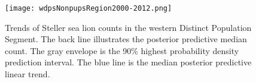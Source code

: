 \documentclass[12pt,letter]{article}
\begin{document}
\nocite{*}


\clearpage

\begin{figure}[htbp] %
   \centering
   \texttt{[image: wdpsNonpupsRegion2000-2012.png]} 
   \caption{Trends of Steller sea lion counts in the western Distinct Population Segment. The back line illustrates the posterior predictive median count. The gray envelope is the 90\% highest probability density prediction interval. The blue line is the median posterior predictive linear trend.}
   \label{fig:example}
\end{figure}
\end{document}
